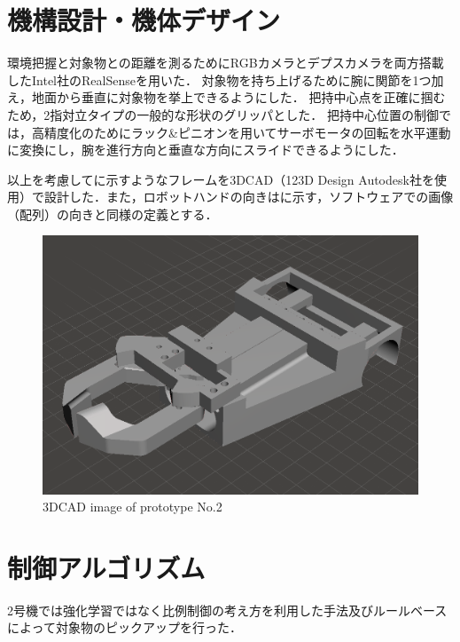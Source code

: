 \section{機構設計・機体デザイン}
環境把握と対象物との距離を測るためにRGBカメラとデプスカメラを両方搭載したIntel社のRealSenseを用いた．
対象物を持ち上げるために腕に関節を1つ加え，地面から垂直に対象物を挙上できるようにした．
把持中心点を正確に掴むため，2指対立タイプの一般的な形状のグリッパとした．
把持中心位置の制御では，高精度化のためにラック\&ピニオンを用いてサーボモータの回転を水平運動に変換にし，腕を進行方向と垂直な方向にスライドできるようにした．

以上を考慮してに示すようなフレームを3DCAD（123D Design Autodesk社を使用）で設計した．また，ロボットハンドの向きはに示す，ソフトウェアでの画像（配列）の向きと同様の定義とする．

\begin{figure}
    \centering
    \includegraphics[width=\linewidth]{figure/chapter4/2号機CAD前}
    \caption{3DCAD image of prototype No.2}
    \label{fig:2号機CAD}
\end{figure}



\section{制御アルゴリズム}
2号機では強化学習ではなく比例制御の考え方を利用した手法及びルールベースによって対象物のピックアップを行った．


